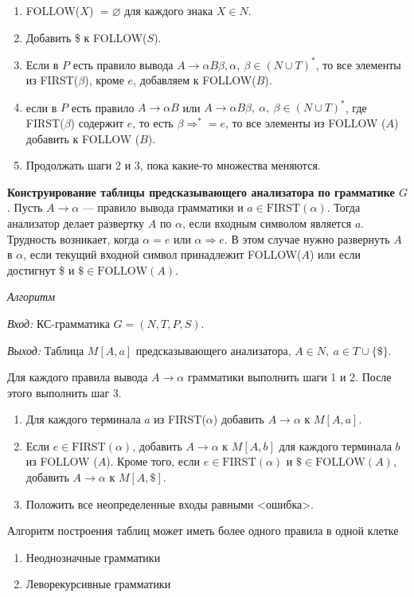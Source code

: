 \begin{enumerate}
    \item FOLLOW($X$) $= \varnothing$ для каждого знака $X \in N$.
    \item Добавить \$ к FOLLOW($S$).
    \item Если в $P$ есть правило вывода $A \rightarrow \alpha B \beta, \alpha,~\beta \in (N \cup T)^\ast$, то все элементы из FIRST($\beta$), кроме $e$, добавляем к FOLLOW($B$).
    \item если в $P$ есть правило $A \rightarrow \alpha B$ или $A \rightarrow \alpha B \beta,~\alpha,~\beta \in (N \cup T)^\ast$, где FIRST($\beta$) содержит $e$, то есть $\beta \Rightarrow^\ast = e$, то все элементы из FOLLOW ($A$) добавить к FOLLOW ($B$).
    \item Продолжать шаги 2 и 3, пока какие-то множества меняются.
\end{enumerate}

\textbf{Конструирование таблицы предсказывающего анализатора по грамматике $G$}.
Пусть $A \rightarrow \alpha$ --- правило вывода грамматики и $a \in \text{FIRST}(\alpha)$.
Тогда анализатор делает развертку $A$ по $\alpha$, если входным символом является $a$.
Трудность возникает, когда $\alpha = e$ или $\alpha \Rightarrow e$.
В этом случае нужно развернуть $A$ в $\alpha$, если текущий входной символ принадлежит FOLLOW($A$) или если достигнут \$ и $\$ \in \text{FOLLOW}(A)$.

\textit{Алгоритм}

\textit{Вход:} КС-грамматика $G = (N, T, P, S)$.

\textit{Выход:} Таблица $M[A, a]$ предсказывающего анализатора, $A \in N,~a \in T \cup \{\$\}$.

Для каждого правила вывода $A \rightarrow \alpha$ грамматики выполнить шаги 1 и 2. После этого выполнить шаг 3.
\begin{enumerate}
    \item Для каждого терминала $a$ из FIRST($\alpha$) добавить $A \rightarrow \alpha$ к $M[A, a]$.
    \item Если $e \in \text{FIRST}(\alpha)$, добавить $A \rightarrow \alpha$ к $M[A, b]$ для каждого терминала $b$ из FOLLOW ($A$).
    Кроме того, если $e \in \text{FIRST}(\alpha)$ и $\$ \in \text{FOLLOW}(A)$, добавить $A \rightarrow \alpha$ к $M[A, \$]$.
    \item Положить все неопределенные входы равными <ошибка>.
\end{enumerate}

Алгоритм построения таблиц может иметь более одного правила в одной клетке
\begin{enumerate}
\item Неоднозначные грамматики
\item Леворекурсивные грамматики
\end{enumerate}

